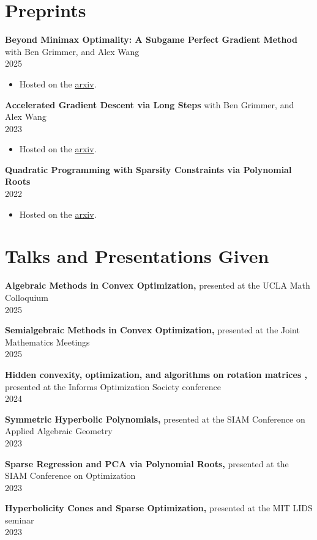 \documentclass[margin]{res}
\begin{document}
\begin{resume}
\section{Preprints}
{\bf  Beyond Minimax Optimality: A Subgame Perfect Gradient Method} with Ben Grimmer, and Alex Wang \\ 2025
\begin{itemize} \itemsep -2pt %
\item Hosted on the \href{https://arxiv.org/abs/2412.06731}{arxiv}.
\end{itemize}
{\bf  Accelerated Gradient Descent via Long Steps} with Ben Grimmer, and Alex Wang \\ 2023
\begin{itemize} \itemsep -2pt %
\item Hosted on the \href{https://arxiv.org/abs/2309.09961}{arxiv}.
\end{itemize}
{\bf  Quadratic Programming with Sparsity Constraints via Polynomial Roots } \\ 2022
\begin{itemize} \itemsep -2pt %
\item Hosted on the \href{https://arxiv.org/abs/2208.11143}{arxiv}.
\end{itemize}

\section{Talks and Presentations Given}
{\bf  Algebraic Methods in Convex Optimization,} presented at the UCLA Math Colloquium \\ 2025

{\bf  Semialgebraic Methods in Convex Optimization,} presented at the Joint Mathematics Meetings \\ 2025 

{\bf  Hidden convexity, optimization, and algorithms on rotation matrices  ,} presented at the Informs Optimization Society conference \\ 2024 

{\bf  Symmetric Hyperbolic Polynomials,} presented at the SIAM Conference on Applied Algebraic Geometry \\ 2023 

{\bf  Sparse Regression and PCA via Polynomial Roots,} presented at the SIAM Conference on Optimization \\ 2023 

{\bf  Hyperbolicity Cones and Sparse Optimization,} presented at the MIT LIDS seminar \\ 2023 


\end{resume}
\end{document}
